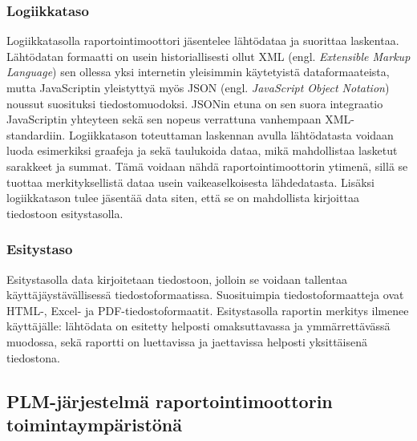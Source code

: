 \subsubsection{Logiikkataso}

Logiikkatasolla raportointimoottori jäsentelee lähtödataa ja suorittaa laskentaa. Lähtödatan formaatti on usein historiallisesti ollut XML (engl. \textit{Extensible Markup Language}) sen ollessa yksi internetin yleisimmin käytetyistä dataformaateista, mutta JavaScriptin yleistyttyä myös JSON (engl. \textit{JavaScript Object Notation}) noussut suosituksi tiedostomuodoksi. JSONin etuna on sen suora integraatio JavaScriptin yhteyteen sekä sen nopeus verrattuna vanhempaan XML-standardiin. \cite{nurseitov_comparison_nodate} Logiikkatason toteuttaman laskennan avulla lähtödatasta voidaan luoda esimerkiksi graafeja ja sekä taulukoida dataa, mikä mahdollistaa lasketut sarakkeet ja summat. Tämä voidaan nähdä raportointimoottorin ytimenä, sillä se tuottaa merkityksellistä dataa usein vaikeaselkoisesta lähdedatasta. Lisäksi logiikkatason tulee jäsentää data siten, että se on mahdollista kirjoittaa tiedostoon esitystasolla.

\subsubsection{Esitystaso}

Esitystasolla data kirjoitetaan tiedostoon, jolloin se voidaan tallentaa käyttäjäystävällisessä tiedostoformaatissa. Suosituimpia tiedostoformaatteja ovat HTML-, Excel- ja PDF-tiedostoformaatit. Esitystasolla raportin merkitys ilmenee käyttäjälle: lähtödata on esitetty helposti omaksuttavassa ja ymmärrettävässä muodossa, sekä raportti on luettavissa ja jaettavissa helposti yksittäisenä tiedostona.

\subsection{PLM-järjestelmä raportointimoottorin toimintaympäristönä}

